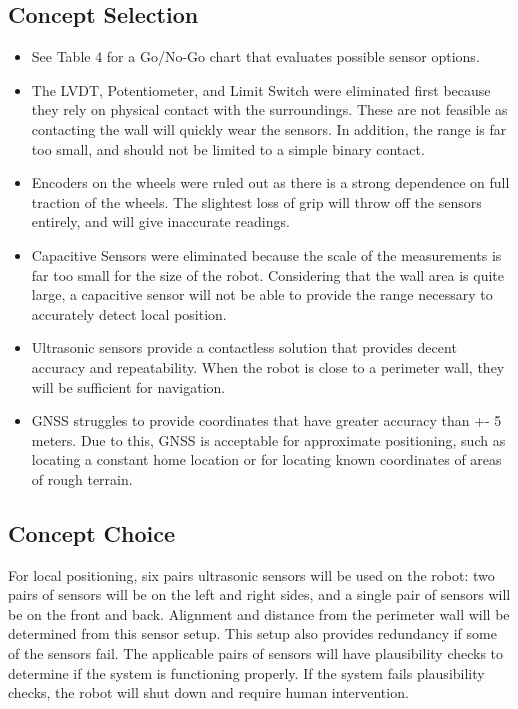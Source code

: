 \documentclass[12pt]{article}
\begin{document}
\subsection{Concept Selection}

\begin{itemize}
\setlength\itemsep{-0.5em}
\item See Table 4 for a Go/No-Go chart that evaluates possible sensor options.
\item The LVDT, Potentiometer, and Limit Switch were eliminated first because they rely on physical contact with the surroundings. These are not feasible as contacting the wall will quickly wear the sensors. In addition, the range is far too small, and should not be limited to a simple binary contact.

\item Encoders on the wheels were ruled out as there is a strong dependence on full traction of the wheels. The slightest loss of grip will throw off the sensors entirely, and will give inaccurate readings.

\item Capacitive Sensors were eliminated because the scale of the measurements is far too small for the size of the robot. Considering that the wall area is quite large, a capacitive sensor will not be able to provide the range necessary to accurately detect local position.

\item Ultrasonic sensors provide a contactless solution that provides decent accuracy and repeatability. When the robot is close to a perimeter wall, they will be sufficient for navigation.

\item GNSS struggles to provide coordinates that have greater accuracy than +- 5 meters. Due to this, GNSS is acceptable for approximate positioning, such as locating a constant home location or for locating known coordinates of areas of rough terrain. 
\end{itemize}

\subsection{Concept Choice}
For local positioning, six pairs ultrasonic sensors will be used on the robot: two pairs of sensors will be on the left and right sides, and a single pair of sensors will be on the front and back. Alignment and distance from the perimeter wall will be determined from this sensor setup. This setup also provides redundancy if some of the sensors fail. The applicable pairs of sensors will have plausibility checks to determine if the system is functioning properly. If the system fails plausibility checks, the robot will shut down and require human intervention.
\end{document}
